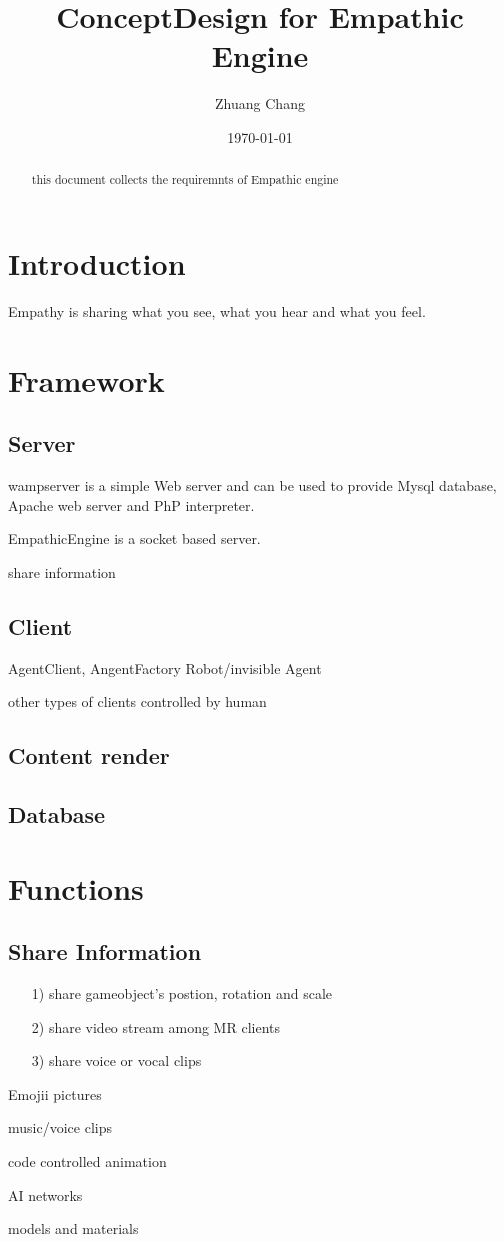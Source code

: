 \documentclass{article}
\begin{document}
\title{ConceptDesign for Empathic Engine}
\author{Zhuang Chang}
\date{\today}
\maketitle
\begin{abstract}
this document collects the requiremnts of Empathic engine

\end{abstract}
\tableofcontents

\section{Introduction}
Empathy is sharing what you see, what you hear and what you
feel.
\section{Framework}
\subsection{Server}

wampserver is a simple Web server and can be  used
to provide Mysql database, Apache web server and PhP
interpreter.

EmpathicEngine is a socket based server.

share information
\subsection{Client}
AgentClient, AngentFactory
Robot/invisible Agent

other types of clients controlled by human
\subsection{Content render}

\subsection{Database}
\section{Functions}
\subsection{Share Information}
\begin{enumerate}
    \item [1)]share gameobject's postion, rotation and scale
    \item [2)]share video stream among MR clients
    \item [3)]share voice or vocal clips
\end{enumerate}
Emojii pictures

music/voice clips

code controlled animation

AI networks

models and materials
\end{document}
